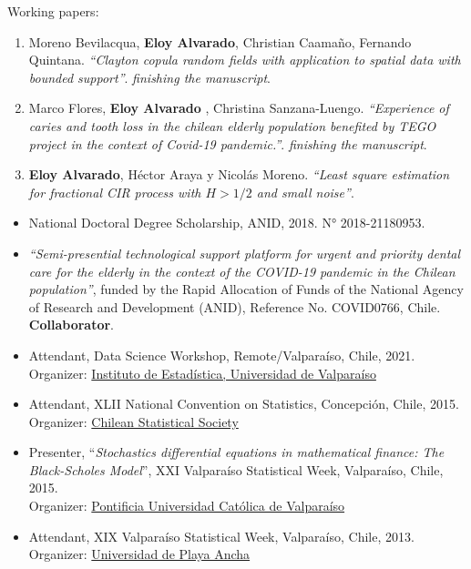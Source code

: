 \documentclass[10pt,a4paper]{article}
\begin{document}
\headedsubsection 
{Working papers:}{}
{\begin{enumerate}
\item Moreno Bevilacqua, \textbf{Eloy Alvarado}, Christian Caamaño, Fernando Quintana. \textit{``Clayton copula random fields with application to spatial data with bounded support''}. \textit{finishing the manuscript}.
\item Marco Flores, \textbf{Eloy Alvarado} , Christina Sanzana-Luengo. \textit{``Experience of caries and tooth loss in the chilean elderly population benefited by TEGO project in the context of Covid-19 pandemic.''}. \textit{finishing the manuscript}.
\item \textbf{Eloy Alvarado}, Héctor Araya y Nicolás Moreno. \textit{``Least square estimation for fractional CIR process with $H>1/2$ and small noise''}.
\end{enumerate}
}

\begin{itemize}
\item National Doctoral Degree Scholarship, ANID, 2018. N° 2018-21180953.
\item \textit{``Semi-presential technological support platform for urgent and
priority dental care for the elderly in the context of the COVID-19 pandemic in the Chilean population''}, funded by the Rapid Allocation of Funds of the National Agency of Research and
Development (ANID), Reference No. COVID0766, Chile. \textbf{Collaborator}.
\end{itemize}




\begin{itemize}
\item Attendant, Data Science Workshop, Remote/Valparaíso, Chile, 2021.\\
Organizer: \href{https://ideuv.uv.cl/}{Instituto de Estadística, Universidad de Valparaíso}

\item Attendant, XLII National Convention on Statistics, Concepción, Chile, 2015. \\
Organizer:  \href{http://www.soche.cl}{ Chilean Statistical
Society}
\item Presenter, ``\textit{Stochastics differential equations in mathematical finance: The Black-Scholes Model}'', XXI Valparaíso Statistical Week, Valparaíso, Chile, 2015. \\ Organizer: \href{http://www.pucv.cl}{Pontificia Universidad Católica de Valparaíso}

\item Attendant, XIX Valparaíso Statistical Week, Valparaíso, Chile, 2013. \\ Organizer:  \href{http://www.upla.cl}{Universidad de Playa Ancha}


\end{itemize}
\end{document}
